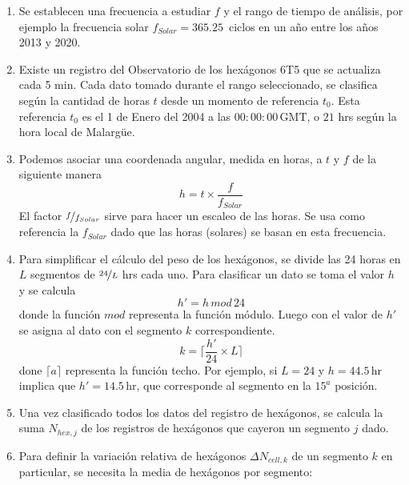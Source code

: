       \begin{enumerate}
        \item Se establecen una frecuencia a estudiar $f$ y el rango de tiempo de análisis, por ejemplo la frecuencia solar $f_{Solar}= 365.25\,$ ciclos en un año entre los años 2013 y 2020.

        \item Existe un registro del Observatorio de los hexágonos 6T5 que se actualiza cada 5 min. Cada dato tomado durante el rango seleccionado, se clasifica según la cantidad de horas $t$ desde un momento de referencia $t_0$. Esta referencia $t_0$ es el 1 de Enero del 2004 a las $00:00:00\,$GMT, o  $21$ hrs según la hora local de Malargüe.

        \item Podemos asociar una coordenada angular, medida en horas,  a $t$  y $f$ de la siguiente manera
         \begin{equation*}
          h = t \times \frac{f}{f_{Solar}}
          \label{eq:h}
        \end{equation*}
        El factor $\nicefrac{f}{f_{Solar}}$ sirve para hacer un escaleo de las horas. Se usa como referencia la $f_{Solar}$ dado que las horas (solares) se basan en esta frecuencia.
        
        \item Para simplificar el cálculo del peso de los hexágonos, se divide las 24 horas en $L$ segmentos de $\nicefrac{24}{L}$ hrs cada uno. Para clasificar un dato se  toma  el valor $h$  y se calcula
        \begin{equation}
                  h' = h\, mod \,24 \label{eq:h_prime}
        \end{equation}
        donde la función $mod$ representa la función módulo. Luego con el valor de $h'$ se asigna al dato con el segmento $k$ correspondiente.
        \begin{equation}
          k = \bigg \lceil \frac{h'}{24}\times L \bigg \rceil
        \end{equation}
        done $\lceil a \rceil$ representa la función techo. Por ejemplo, si $L=24$ y  $h=44.5\,$hr implica que $h'= 14.5\,$hr, que corresponde al segmento en la $15^{a}$ posición.

        \item Una vez clasificado todos los datos del registro de hexágonos, se calcula la suma  $N_{hex, j}$ de los registros de hexágonos que cayeron un segmento $j$ dado.

        \item Para definir la variación relativa de hexágonos  $\Delta N_{cell,k}$ de un segmento $k$ en particular, se necesita la media de hexágonos por segmento:
       

\end{enumerate}

